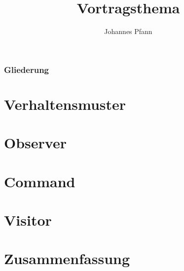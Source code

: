 \documentclass[compress]{beamer}
\author[Pfann]{%
  Johannes Pfann
}
\date{}
\institute[FAU Erlangen-Nürnberg]{
  Lehrstuhl für Software Engineering\\
  Friedrich-Alexander-Universität Erlangen-Nürnberg
}
\title{Vortragsthema}
\begin{document}
\frame{\titlepage} 

\begin{frame}
	\frametitle{Gliederung}
	\tableofcontents[hideallsubsections]
\end{frame}


\section[Verhaltensmuster]{Verhaltensmuster}

\section[Observer]{Observer}

\section[Command]{Command}

\section[Visitor]{Visitor}

\section[Zusammenfassung]{Zusammenfassung}



\end{document}
